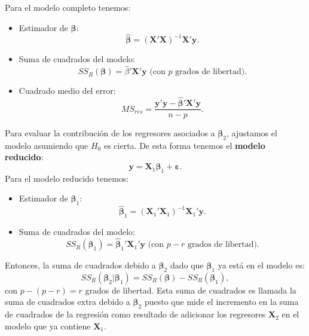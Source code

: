 \documentclass[
]{article}
\providecommand{\tightlist}{%
  \setlength{\itemsep}{0pt}\setlength{\parskip}{0pt}}
\begin{document}
Para el modelo completo tenemos:

\begin{itemize}
\tightlist
\item
  Estimador de \(\boldsymbol \beta\):
  \[
  \widehat{\boldsymbol \beta}= (\boldsymbol X'\boldsymbol X)^{-1}\boldsymbol X'\boldsymbol y.
  \]
\item
  Suma de cuadrados del modelo:
  \[
  SS_{R}(\boldsymbol \beta) = \widehat{\beta}'\boldsymbol X'\boldsymbol y\mbox{ (con }p\mbox{ grados de libertad)}.
  \]
\item
  Cuadrado medio del error:
  \[
  MS_{res} = \frac{\boldsymbol y'\boldsymbol y- \widehat{\boldsymbol \beta}'\boldsymbol X'\boldsymbol y}{n-p}.
  \]
\end{itemize}

Para evaluar la contribución de los regresores asociados a \(\boldsymbol \beta_{2}\), ajustamos el modelo asumiendo que \(H_{0}\) es cierta. De esta forma tenemos el \textbf{modelo reducido}:
\[
\boldsymbol y= \boldsymbol X_{1}\boldsymbol \beta_{1} + \boldsymbol \varepsilon.
\]
Para el modelo reducido tenemos:

\begin{itemize}
\tightlist
\item
  Estimador de \(\boldsymbol \beta_{1}\):
  \[
  \widehat{\boldsymbol \beta}_{1} = (\boldsymbol X_{1}'\boldsymbol X_{1})^{-1}\boldsymbol X_{1}'\boldsymbol y.
  \]
\item
  Suma de cuadrados del modelo:
  \[
  SS_{R}(\boldsymbol \beta_{1}) = \widehat{\boldsymbol \beta}_{1}'\boldsymbol X_{1}'\boldsymbol y\mbox{ (con $p-r$ grados de libertad)}.
  \]
\end{itemize}

Entonces, la suma de cuadrados debido a \(\boldsymbol \beta_{2}\) dado que \(\boldsymbol \beta_{1}\) ya está en el modelo es:
\[
SS_{R}(\boldsymbol \beta_{2}| \boldsymbol \beta_{1}) = SS_{R}(\boldsymbol \beta) - SS_{R}(\boldsymbol \beta_{1}),
\]
con \(p-(p-r)=r\) grados de libertad. Esta suma de cuadrados es llamada la suma de cuadrados extra debido a \(\boldsymbol \beta_2\) puesto que mide el incremento en la suma de cuadrados de la regresión como resultado de adicionar los regresores \(\boldsymbol X_{2}\) en el modelo que ya contiene \(\boldsymbol X_{1}\).
\end{document}
